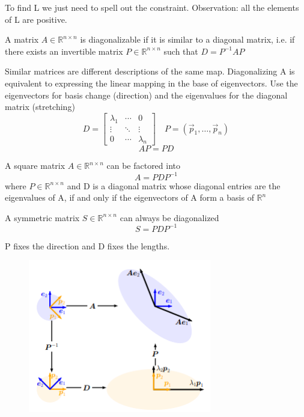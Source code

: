 To find L we just need to spell out the constraint. Observation: all the elements of L are positive.
\begin{definition}[Diagonalizable]
    A matrix $A \in \mathbb{R}^{n\times n}$ is diagonalizable if it is similar to a diagonal matrix, i.e. if there exists an invertible matrix $P \in \mathbb{R}^{n\times n}$ such that $D = P^{-1}AP$
\end{definition}
Similar matrices are different descriptions of the same map. Diagonalizing A is equivalent to expressing the linear mapping in the base of eigenvectors. Use the eigenvectors for basis change (direction) and the eigenvalues for the diagonal matrix (stretching)
\[ 
    D =
    \begin{bmatrix}
        \lambda_1 & \cdots & 0 \\
        \vdots & \ddots & \vdots \\
        0 & \cdots & \lambda_n
    \end{bmatrix} 
    \quad P = (\vec{p}_{1}, \ldots,\vec{p}_{n})
\]
\[ 
    AP = PD 
\]
\begin{theorem}[Eigendecomposition]
    A square matrix $A \in \mathbb{R}^{n\times n}$ can be factored into \[ 
        A = PDP^{-1} 
    \]
    where $P \in \mathbb{R}^{n\times n}$ and D is a diagonal matrix whose diagonal entries are the eigenvalues of A, if and only if the eigenvectors of A form a basis of $\mathbb{R}^n$
    
\end{theorem}
\begin{theorem}
    A symmetric matrix $S \in \mathbb{R}^{n\times n}$ can always be diagonalized
    \[ 
        S = PDP^{-1} 
    \]
\end{theorem}
P fixes the direction and D fixes the lengths.
\begin{figure}[htbp]
    \centering
    \includegraphics[width=8cm]{Math/eigendecomposition.png}
\end{figure}
